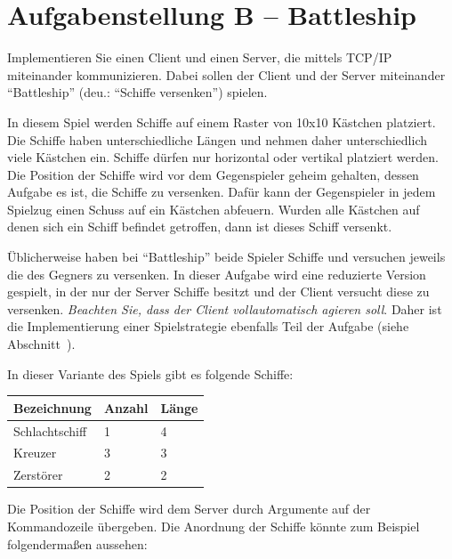 

\usepackage{graphicx}
\usepackage{bytefield}

\newcommand{\baselinecenterit}[1]{%
  \centering
  \raisebox{0pt}[\heightof{W}][0pt]{\itshape #1}%
}


\sloppy
{}

\section*{Aufgabenstellung B -- Battleship}\label{sec:aufgabenstellung}
Implementieren Sie einen Client und einen Server, die mittels TCP/IP
miteinander kommunizieren. Dabei sollen der Client und der Server miteinander
``Battleship'' (deu.: ``Schiffe versenken'') spielen.

In diesem Spiel werden Schiffe auf einem Raster von 10x10 Kästchen platziert.
Die Schiffe haben unterschiedliche Längen und nehmen daher unterschiedlich viele Kästchen ein.
Schiffe dürfen nur horizontal oder vertikal platziert werden.
Die Position der Schiffe wird vor dem Gegenspieler geheim gehalten,
dessen Aufgabe es ist, die Schiffe zu versenken.
Dafür kann der Gegenspieler in jedem Spielzug einen Schuss auf ein Kästchen abfeuern.
Wurden alle Kästchen auf denen sich ein Schiff befindet getroffen, dann ist dieses Schiff versenkt.

Üblicherweise haben bei ``Battleship'' beide Spieler Schiffe und versuchen jeweils die des Gegners
zu versenken. In dieser Aufgabe wird eine reduzierte Version gespielt,
in der nur der Server Schiffe besitzt und der Client versucht diese zu versenken.
\emph{Beachten Sie, dass der Client vollautomatisch agieren soll}. Daher
ist die Implementierung einer Spielstrategie ebenfalls Teil der Aufgabe
(siehe Abschnitt~).

In dieser Variante des Spiels gibt es folgende Schiffe:

{\centering
\begin{tabular}{ | l | l | l | }
\hline
Bezeichnung    & Anzahl & Länge \\
\hline
Schlachtschiff & 1 & 4 \\
Kreuzer        & 3 & 3 \\
Zerstörer      & 2 & 2 \\
\hline
\end{tabular}\par
}

Die Position der Schiffe wird dem Server durch Argumente auf der Kommandozeile
übergeben. Die Anordnung der Schiffe könnte zum Beispiel folgendermaßen aussehen:

